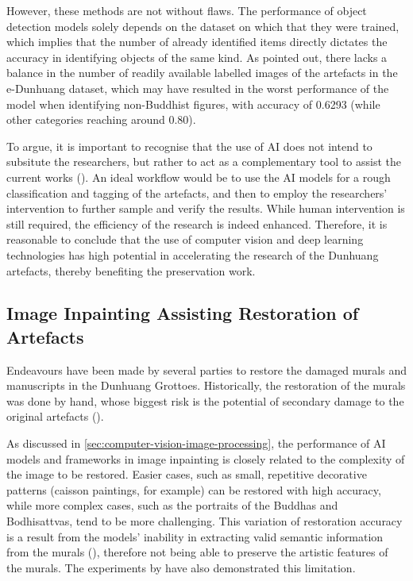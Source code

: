 However, these methods are not without flaws. The performance of object detection models solely depends on the
dataset on which that they were trained, which implies that the number of already identified items directly
dictates the accuracy in identifying objects of the same kind. As  pointed out,
there lacks a balance in the number of readily available labelled images of the artefacts in the e-Dunhuang
dataset, which may have resulted in the worst performance of the model when identifying non-Buddhist figures,
with accuracy of 0.6293 (while other categories reaching around 0.80).

To argue, it is important to recognise that the use of AI does not intend to subsitute the researchers, but rather
to act as a complementary tool to assist the current works
(). An ideal workflow would be to use the AI models for
a rough classification and tagging of the artefacts, and then to employ the researchers' intervention to further
sample and verify the results. While human intervention is still required, the efficiency of the research is indeed
enhanced. Therefore, it is reasonable to conclude that the use of computer vision and deep learning technologies
has high potential in accelerating the research of the Dunhuang artefacts, thereby benefiting the preservation
work.

\subsection{Image Inpainting Assisting Restoration of Artefacts}

Endeavours have been made by several parties to restore the damaged murals and manuscripts in the Dunhuang
Grottoes. Historically, the restoration of the murals was done by hand, whose biggest risk is the potential
of secondary damage to the original artefacts ().

As discussed in \cref{sec:computer-vision-image-processing}, the performance of AI models and frameworks in
image inpainting is closely related to the complexity of the image to be restored. Easier cases, such as
small, repetitive decorative patterns (caisson paintings, for example) can be restored with high accuracy,
while more complex cases, such as the portraits of the Buddhas and Bodhisattvas, tend to be more challenging.
This variation of restoration accuracy is a result from the models' inability in extracting valid semantic
information from the murals (), therefore not being able
to preserve the artistic features of the murals. The experiments by  have
also demonstrated this limitation.

